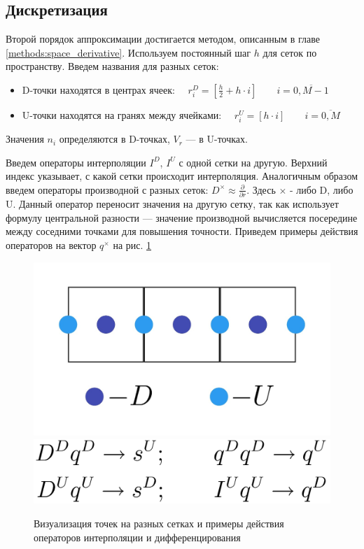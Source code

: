 \subsection{Дискретизация \label{dhd:discretization}}
Второй порядок аппроксимации достигается методом, описанным в главе \ref{methods:space_derivative}. Используем постоянный шаг $h$ для сеток по пространству. Введем названия для разных сеток:
\begin{itemize}
\item D-точки находятся в центрах ячеек: $\quad r^D_{i} = \left[ \frac{h}{2} + h \cdot i\right] \quad \quad i = \overline{0, M-1}$
\item U-точки находятся на гранях между ячейками: $\quad r^U_{i} = \left[ h \cdot i\right] \quad \quad i = \overline{0, M}$
\end{itemize}
Значения $n_i$ определяются в D-точках, $V_r$ --- в U-точках.
\par
Введем операторы интерполяции $I^D$, $I^U$ с одной сетки на другую. Верхний индекс указывает, с какой сетки происходит интерполяция. Аналогичным образом введем операторы производной с разных сеток: $D^{\times} \approx \frac {\partial } {\partial r}$. Здесь $\times$ - либо D, либо U. Данный оператор переносит значения на другую сетку, так как использует формулу центральной разности --- значение производной вычисляется посередине между соседними точками для повышения точности. Приведем примеры действия операторов на вектор $q^\times$ на рис. \ref{fig:dhd_points}
\begin{figure}[H]
  \centering
  \includegraphics[valign = c, width = .5\linewidth]{common_images/dhd_points.jpg} \qquad
  \includegraphics[width = .3\linewidth]{common_images/dhd_interpolation.png}
  \caption{Визуализация точек на разных сетках и примеры действия операторов интерполяции и дифференцирования}
  \label{fig:dhd_points}
\end{figure}

